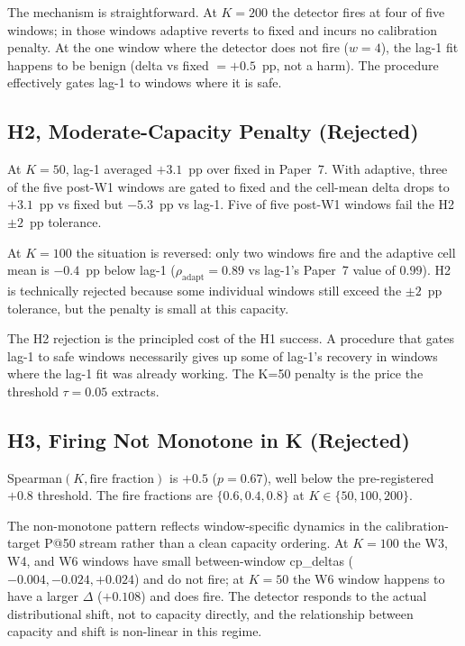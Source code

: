 The mechanism is straightforward. At $K = 200$ the detector fires
at four of five windows; in those windows \textsf{adaptive} reverts
to \textsf{fixed} and incurs no calibration penalty. At the one
window where the detector does not fire ($w = 4$), the lag-1 fit
happens to be benign (delta vs fixed $= +0.5$~pp, not a harm). The
procedure effectively gates lag-1 to windows where it is safe.

\subsection{H2, Moderate-Capacity Penalty (Rejected)}

At $K = 50$, lag-1 averaged $+3.1$~pp over fixed in Paper~7. With
\textsf{adaptive}, three of the five post-W1 windows are gated to
\textsf{fixed} and the cell-mean delta drops to $+3.1$~pp vs fixed
but $-5.3$~pp vs lag-1. Five of five post-W1 windows fail the H2
$\pm 2$~pp tolerance.

At $K = 100$ the situation is reversed: only two windows fire and
the adaptive cell mean is $-0.4$~pp below lag-1 ($\rho_{\text{adapt}}
= 0.89$ vs lag-1's Paper~7 value of $0.99$). H2 is technically
rejected because some individual windows still exceed the $\pm
2$~pp tolerance, but the penalty is small at this capacity.

The H2 rejection is the principled cost of the H1 success. A
procedure that gates lag-1 to safe windows necessarily gives up some
of lag-1's recovery in windows where the lag-1 fit was already
working. The K=50 penalty is the price the threshold $\tau = 0.05$
extracts.

\subsection{H3, Firing Not Monotone in K (Rejected)}

Spearman$(K, \text{fire fraction})$ is $+0.5$ ($p = 0.67$), well
below the pre-registered $+0.8$ threshold. The fire fractions are
$\{0.6, 0.4, 0.8\}$ at $K \in \{50, 100, 200\}$.

The non-monotone pattern reflects window-specific dynamics in the
calibration-target P@50 stream rather than a clean capacity
ordering. At $K = 100$ the W3, W4, and W6 windows have small
between-window cp\_deltas ($-0.004, -0.024, +0.024$) and do not fire;
at $K = 50$ the W6 window happens to have a larger $\Delta$
($+0.108$) and does fire. The detector responds to the actual
distributional shift, not to capacity directly, and the relationship
between capacity and shift is non-linear in this regime.

